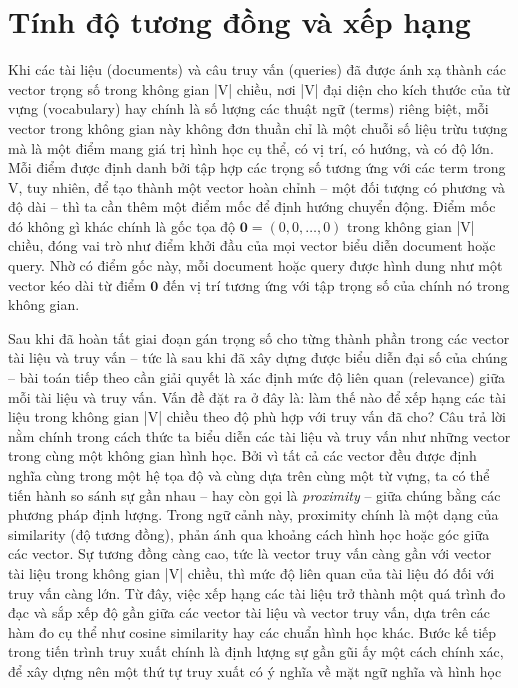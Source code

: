 \section{Tính độ tương đồng và xếp hạng}
Khi các tài liệu (documents) và câu truy vấn (queries) đã được ánh xạ thành các vector trọng số trong không gian |V| chiều, nơi |V| đại diện cho kích thước của từ vựng \allowbreak (vocabulary) hay chính là số lượng các thuật ngữ (terms) riêng biệt, mỗi vector trong không gian này không đơn thuần chỉ là một chuỗi số liệu trừu tượng mà là một điểm mang giá trị hình học cụ thể, có vị trí, có hướng, và có độ lớn. Mỗi điểm được định danh bởi tập hợp các trọng số tương ứng với các term trong V, tuy nhiên, để tạo thành một vector hoàn chỉnh -- một đối tượng có phương và độ dài -- thì ta cần thêm một điểm mốc để định hướng chuyển động. Điểm mốc đó không gì khác chính là gốc tọa độ \(\mathbf{0} = (0, 0, \dots, 0)\) trong không gian |V| chiều, đóng vai trò như điểm khởi đầu của mọi vector biểu diễn document hoặc query. Nhờ có điểm gốc này, mỗi document hoặc query được hình dung như một vector kéo dài từ điểm \(\mathbf{0}\) đến vị trí tương ứng với tập trọng số của chính nó trong không gian.

Sau khi đã hoàn tất giai đoạn gán trọng số cho từng thành phần trong các vector tài liệu và truy vấn -- tức là sau khi đã xây dựng được biểu diễn đại số của chúng -- bài toán tiếp theo cần giải quyết là xác định mức độ liên quan (relevance) giữa mỗi tài liệu và truy vấn. Vấn đề đặt ra ở đây là: làm thế nào để xếp hạng các tài liệu trong không gian |V| chiều theo độ phù hợp với truy vấn đã cho? Câu trả lời nằm chính trong cách thức ta biểu diễn các tài liệu và truy vấn như những vector trong cùng một không gian hình học. Bởi vì tất cả các vector đều được định nghĩa cùng trong một hệ tọa độ và cùng dựa trên cùng một từ vựng, ta có thể tiến hành so sánh sự gần nhau -- hay còn gọi là \textit{proximity} -- giữa chúng bằng các phương pháp định lượng. Trong ngữ cảnh này, proximity chính là một dạng của similarity (độ tương đồng), phản ánh qua khoảng cách hình học hoặc góc giữa các vector. Sự tương đồng càng cao, tức là vector truy vấn càng gần với vector tài liệu trong không gian |V| chiều, thì mức độ liên quan của tài liệu đó đối với truy vấn càng lớn. Từ đây, việc xếp hạng các tài liệu trở thành một quá trình đo đạc và sắp xếp độ gần giữa các vector tài liệu và vector truy vấn, dựa trên các hàm đo cụ thể như cosine similarity hay các chuẩn hình học khác. Bước kế tiếp trong tiến trình truy xuất chính là định lượng sự gần gũi ấy một cách chính xác, để xây dựng nên một thứ tự truy xuất có ý nghĩa về mặt ngữ nghĩa và hình học


